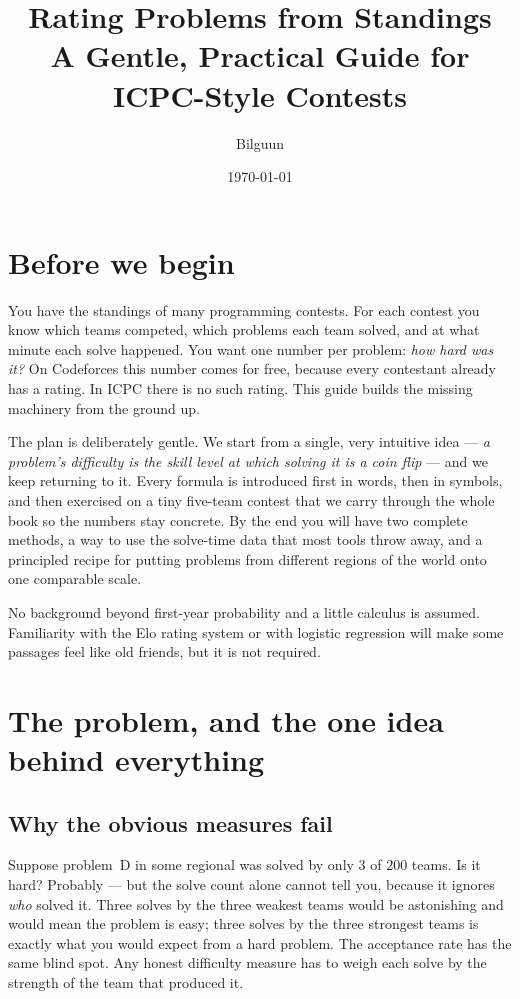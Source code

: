 \documentclass[11pt]{report}
\title{\textbf{Rating Problems from Standings}\\[4pt]
\large A Gentle, Practical Guide for ICPC-Style Contests}
\author{Bilguun}
\date{\today}
\theoremstyle{definition}
\numberwithin{equation}{chapter}
\begin{document}
\maketitle

\tableofcontents

\chapter*{Before we begin}

You have the standings of many programming contests. For each contest you know
which teams competed, which problems each team solved, and at what minute each
solve happened. You want one number per problem: \emph{how hard was it?} On
Codeforces this number comes for free, because every contestant already has a
rating. In ICPC there is no such rating. This guide builds the missing
machinery from the ground up.

The plan is deliberately gentle. We start from a single, very intuitive idea ---
\emph{a problem's difficulty is the skill level at which solving it is a
coin flip} --- and we keep returning to it. Every formula is introduced first in
words, then in symbols, and then exercised on a tiny five-team contest that we
carry through the whole book so the numbers stay concrete. By the end you will
have two complete methods, a way to use the solve-time data that most tools throw
away, and a principled recipe for putting problems from different regions of the
world onto one comparable scale.

No background beyond first-year probability and a little calculus is assumed.
Familiarity with the Elo rating system or with logistic regression will make some
passages feel like old friends, but it is not required.

\chapter{The problem, and the one idea behind everything}

\section{Why the obvious measures fail}

Suppose problem~D in some regional was solved by only $3$ of $200$ teams. Is it
hard? Probably --- but the solve count alone cannot tell you, because it ignores
\emph{who} solved it. Three solves by the three weakest teams would be
astonishing and would mean the problem is easy; three solves by the three
strongest teams is exactly what you would expect from a hard problem. The
acceptance rate has the same blind spot. Any honest difficulty measure has to
weigh each solve by the strength of the team that produced it.
\end{document}
